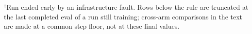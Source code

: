 \documentclass[11pt]{amsart}
\begin{document}
\begin{center}
\smallskip
{\small $^{\ddagger}$Run ended early by an infrastructure fault. Rows below
the rule are truncated at the last completed eval of a run still training;
cross-arm comparisons in the text are made at a common step floor, not at
these final values.}
\end{center}
\end{document}
